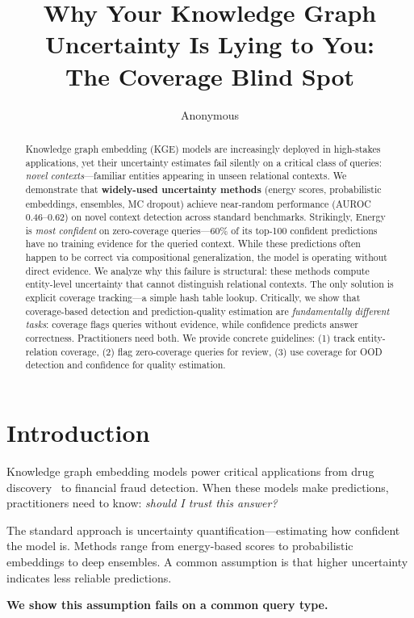 \documentclass{article}
\title{Why Your Knowledge Graph Uncertainty Is Lying to You:\\The Coverage Blind Spot}
\author{Anonymous}
\begin{document}
\maketitle

\begin{abstract}
Knowledge graph embedding (KGE) models are increasingly deployed in high-stakes applications, yet their uncertainty estimates fail silently on a critical class of queries: \emph{novel contexts}---familiar entities appearing in unseen relational contexts. We demonstrate that \textbf{widely-used uncertainty methods} (energy scores, probabilistic embeddings, ensembles, MC dropout) achieve near-random performance (AUROC 0.46--0.62) on novel context detection across standard benchmarks. Strikingly, Energy is \emph{most confident} on zero-coverage queries---60\% of its top-100 confident predictions have no training evidence for the queried context. While these predictions often happen to be correct via compositional generalization, the model is operating without direct evidence. We analyze why this failure is structural: these methods compute entity-level uncertainty that cannot distinguish relational contexts. The only solution is explicit coverage tracking---a simple hash table lookup. Critically, we show that coverage-based detection and prediction-quality estimation are \emph{fundamentally different tasks}: coverage flags queries without evidence, while confidence predicts answer correctness. Practitioners need both. We provide concrete guidelines: (1) track entity-relation coverage, (2) flag zero-coverage queries for review, (3) use coverage for OOD detection and confidence for quality estimation.
\end{abstract}

\section{Introduction}

Knowledge graph embedding models power critical applications from drug discovery~\citep{bonner2022review} to financial fraud detection. When these models make predictions, practitioners need to know: \emph{should I trust this answer?}

The standard approach is uncertainty quantification---estimating how confident the model is. Methods range from energy-based scores to probabilistic embeddings to deep ensembles. A common assumption is that higher uncertainty indicates less reliable predictions.

\textbf{We show this assumption fails on a common query type.}
\end{document}
